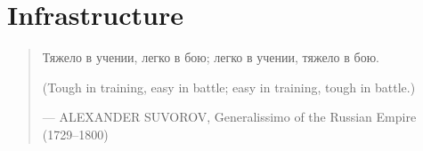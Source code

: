 
\chapter{Infrastructure}

\begin{quotation}

\footnotesize\sffamily\itshape

\begin{flushright}


Тяжело в учении, легко в бою; легко в учении, тяжело в бою.


\smallbreak

(Tough in training, easy in battle; easy in training, tough in battle.)

\smallbreak

\upshape

--- ALEXANDER SUVOROV, Generalissimo of the Russian Empire (1729--1800)

\end{flushright}

\end{quotation}




